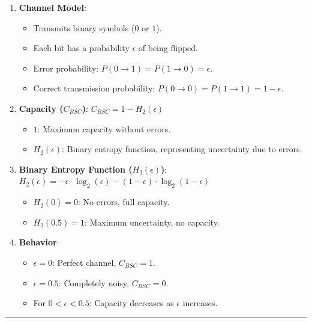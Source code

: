 \documentclass[11pt]{article}
\providecommand{\tightlist}{%
      \setlength{\itemsep}{0pt}\setlength{\parskip}{0pt}}
\begin{document}
\begin{enumerate}
\def\labelenumi{\arabic{enumi}.}
\tightlist
\item
  \textbf{Channel Model}:

  \begin{itemize}
  \tightlist
  \item
    Transmits binary symbols (\(0\) or \(1\)).
  \item
    Each bit has a probability \(\epsilon\) of being flipped.
  \item
    Error probability: \(P(0 \to 1) = P(1 \to 0) = \epsilon\).
  \item
    Correct transmission probability:
    \(P(0 \to 0) = P(1 \to 1) = 1 - \epsilon\).
  \end{itemize}
\item
  \textbf{Capacity (\(C_{BSC}\))}:
  \(\boxed{C_{BSC} = 1 - H_2(\epsilon)}\)

  \begin{itemize}
  \tightlist
  \item
    \textbf{\(1\)}: Maximum capacity without errors.
  \item
    \textbf{\(H_2(\epsilon)\)}: Binary entropy function, representing
    uncertainty due to errors.
  \end{itemize}
\item
  \textbf{Binary Entropy Function (\(H_2(\epsilon)\))}:
  \(\boxed{H_2(\epsilon) = - \epsilon \cdot \log_2(\epsilon) - (1 - \epsilon) \cdot \log_2(1 - \epsilon)}\)

  \begin{itemize}
  \tightlist
  \item
    \(H_2(0) = 0\): No errors, full capacity.
  \item
    \(H_2(0.5) = 1\): Maximum uncertainty, no capacity.
  \end{itemize}
\item
  \textbf{Behavior}:

  \begin{itemize}
  \tightlist
  \item
    \(\epsilon = 0\): Perfect channel, \(C_{BSC} = 1\).
  \item
    \(\epsilon = 0.5\): Completely noisy, \(C_{BSC} = 0\).
  \item
    For \(0 < \epsilon < 0.5\): Capacity decreases as \(\epsilon\)
    increases.
  \end{itemize}
\end{enumerate}

\begin{center}\rule{0.5\linewidth}{0.5pt}\end{center}
\end{document}

